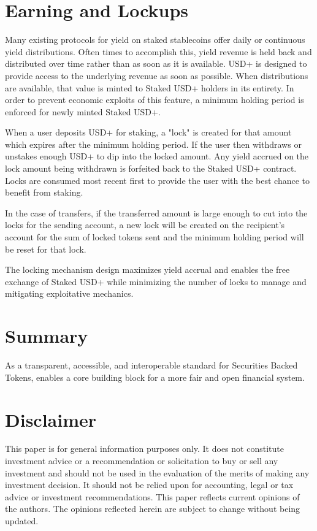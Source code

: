 \documentclass[sigconf,nonacm,prologue,table]{acmart}
\begin{document}
\section{Earning and Lockups}
\label{sec:lockups}

Many existing protocols for yield on staked stablecoins offer daily or continuous yield distributions. Often times to accomplish this, yield revenue is held back and distributed over time rather than as soon as it is available. USD+ is designed to provide access to the underlying revenue as soon as possible. When distributions are available, that value is minted to Staked USD+ holders in its entirety. In order to prevent economic exploits of this feature, a minimum holding period is enforced for newly minted Staked USD+.

When a user deposits USD+ for staking, a "lock" is created for that amount which expires after the minimum holding period. If the user then withdraws or unstakes enough USD+ to dip into the locked amount. Any yield accrued on the lock amount being withdrawn is forfeited back to the Staked USD+ contract. Locks are consumed most recent first to provide the user with the best chance to benefit from staking.

In the case of transfers, if the transferred amount is large enough to cut into the locks for the sending account, a new lock will be created on the recipient's account for the sum of locked tokens sent and the minimum holding period will be reset for that lock.

The locking mechanism design maximizes yield accrual and enables the free exchange of Staked USD+ while minimizing the number of locks to manage and mitigating exploitative mechanics.

\section{Summary}

As a transparent, accessible, and interoperable standard for Securities Backed Tokens, \dshares enables a core building block for a more fair and open financial system.

% 
% 

\section*{Disclaimer}

This paper is for general information purposes only. It does not constitute investment advice or a recommendation or solicitation to buy or sell any investment and should not be used in the evaluation of the merits of making any investment decision. It should not be relied upon for accounting, legal or tax advice or investment recommendations.  This paper reflects current opinions of the authors. The opinions reflected herein are subject to change without being updated. 
\end{document}
